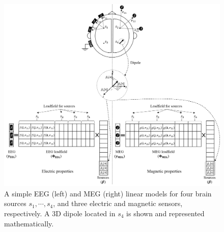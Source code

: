 \begin{figure}[!b]
\centering
\includegraphics[width=1\textwidth,keepaspectratio]{images/EEG_MEG_LF.png} %
\centering
\caption{A simple EEG (left) and MEG (right) linear models for four brain sources $s_1 , \cdots , s_4$, and three electric and magnetic sensors, respectively.
A 3D dipole located in $s_4$ is shown and represented mathematically.} %
\label{fig:EEG_MEG_LF}
\end{figure}